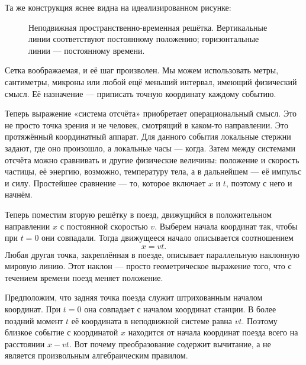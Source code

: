 Та же конструкция яснее видна на идеализированном рисунке:

\begin{figure}[H]
\centering
{}
\caption{Неподвижная пространственно-временная решётка. Вертикальные линии соответствуют постоянному положению; горизонтальные линии — постоянному времени.}
\end{figure}

Сетка воображаемая, и её шаг произволен. Мы можем использовать метры, сантиметры, микроны или любой ещё меньший интервал, имеющий физический смысл. Её назначение — приписать точную координату каждому событию.

Теперь выражение «система отсчёта» приобретает операциональный смысл. Это не просто точка зрения и не человек, смотрящий в каком-то направлении. Это протяжённый координатный аппарат. Для данного события локальные стержни задают, где оно произошло, а локальные часы — когда. Затем между системами отсчёта можно сравнивать и другие физические величины: положение и скорость частицы, её энергию, возможно, температуру тела, а в дальнейшем — её импульс и силу. Простейшее сравнение — то, которое включает \(x\) и \(t\), поэтому с него и начнём.

Теперь поместим вторую решётку в поезд, движущийся в положительном направлении \(x\) с постоянной скоростью \(v\). Выберем начала координат так, чтобы при \(t=0\) они совпадали. Тогда движущееся начало описывается соотношением
\begin{equation}
x=vt.
\end{equation}
Любая другая точка, закреплённая в поезде, описывает параллельную наклонную мировую линию. Этот наклон — просто геометрическое выражение того, что с течением времени поезд меняет положение.

Предположим, что задняя точка поезда служит штрихованным началом координат. При \(t=0\) она совпадает с началом координат станции. В более поздний момент \(t\) её координата в неподвижной системе равна \(vt\). Поэтому близкое событие с координатой \(x\) находится от начала координат поезда всего на расстоянии \(x-vt\). Вот почему преобразование содержит вычитание, а не является произвольным алгебраическим правилом.

